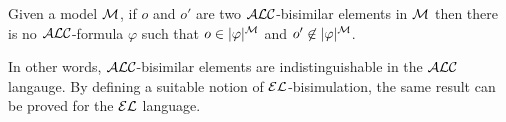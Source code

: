 \begin{theorem}
Given a model $\mathcal{M}$, if  $o$ and $o'$ are two $\mathcal{ALC}$-bisimilar elements in $\mathcal{M}$
then there is no $\mathcal{ALC}$-formula $\varphi$ such that $o \in |\varphi|^{\mathcal{M}}$ and
$o' \not \in |\varphi|^{\mathcal{M}}$.
\end{theorem}

In other words, $\mathcal{ALC}$-bisimilar elements are indistinguishable in the $\mathcal{ALC}$ langauge.
By defining a suitable notion of $\mathcal{EL}$-bisimulation, the same result can be proved for
the $\mathcal{EL}$ language.



\cite{dovier04:_effic_algor_for_comput_bisim_equiv}

